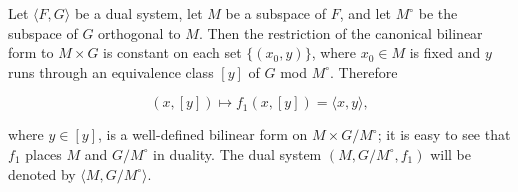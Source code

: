 Let $\langle F, G \rangle$ be a dual system, let $M$ be a subspace of $F$, and let $M^\circ$ be the subspace of $G$ orthogonal to $M$. Then the restriction of the canonical bilinear form to $M \times G$ is constant on each set $\{(x_0, y)\}$, where $x_0 \in M$ is fixed and $y$ runs through an equivalence class $[y]$ of $G$ mod $M^\circ$. Therefore

$$(x, [y]) \mapsto f_1(x, [y]) = \langle x, y \rangle,$$

where $y \in [y]$, is a well-defined bilinear form on $M \times G/M^\circ$; it is easy to see that $f_1$ places $M$ and $G/M^\circ$ in duality. The dual system $(M, G/M^\circ, f_1)$ will be denoted by $\langle M, G/M^\circ \rangle$.
